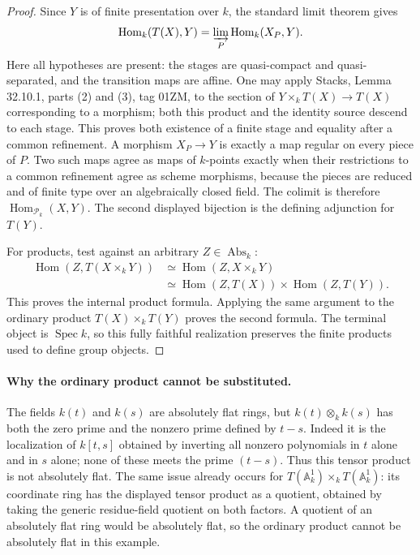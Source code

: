 \begin{proof}
Since $Y$ is of finite presentation over $k$, the standard limit
theorem gives
\[
 \operatorname{Hom}_k(T(X),Y)
 =\varinjlim_P\operatorname{Hom}_k(X_P,Y).
\]
Here all hypotheses are present: the stages are quasi-compact and
quasi-separated, and the transition maps are affine.  One may apply
Stacks, Lemma 32.10.1, parts (2) and (3), tag 01ZM\cite[tag 01ZM]{BStacks}, to the section of
$Y\times_k T(X)\to T(X)$ corresponding to a morphism; both this
product and the identity source descend to each stage.  This proves
both existence of a finite stage and equality after a common
refinement.  A morphism $X_P\to Y$ is exactly a map regular on every
piece of $P$.  Two such maps agree as maps of $k$-points exactly when
their restrictions to a common refinement agree as scheme morphisms,
because the pieces are reduced and of finite type over an algebraically
closed field.  The colimit is therefore
$\operatorname{Hom}_{\mathcal P_k}(X,Y)$.  The second displayed
bijection is the defining adjunction for $T(Y)$.

For products, test against an arbitrary $Z\in\operatorname{Abs}_k$:
\[
\begin{aligned}
 \operatorname{Hom}(Z,T(X\times_kY))
  &\simeq\operatorname{Hom}(Z,X\times_kY)\\
  &\simeq\operatorname{Hom}(Z,T(X))\times
          \operatorname{Hom}(Z,T(Y)).
\end{aligned}
\]
This proves the internal product formula.  Applying the same argument
to the ordinary product $T(X)\times_kT(Y)$ proves the second formula.
The terminal object is $\operatorname{Spec}k$, so this fully faithful
realization preserves the finite products used to define group objects.
\end{proof}

\paragraph{Why the ordinary product cannot be substituted.}
The fields $k(t)$ and $k(s)$ are absolutely flat rings, but
$k(t)\otimes_k k(s)$ has both the zero prime and the nonzero prime
defined by $t-s$.  Indeed it is the localization of $k[t,s]$ obtained
by inverting all nonzero polynomials in $t$ alone and in $s$ alone;
none of these meets the prime $(t-s)$.  Thus this tensor product is
not absolutely flat.  The same issue already occurs for
$T(\mathbb A^1_k)\times_k T(\mathbb A^1_k)$: its coordinate ring
has the displayed tensor product as a quotient, obtained by taking
the generic residue-field quotient on both factors.  A quotient of
an absolutely flat ring would be absolutely flat, so the ordinary
product cannot be absolutely flat in this example.

